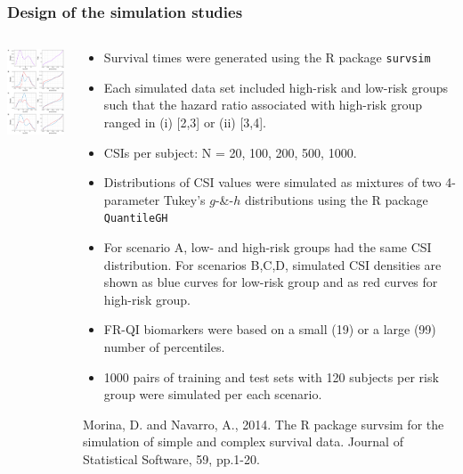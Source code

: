 \documentclass[t,8pt]{beamer}
\begin{document}
\frame
   {\frametitle{Design of the simulation studies}  	 
     \begin{columns}[T]
		      \begin{column}{0.4\textwidth}
			\includegraphics[width=2in] {Figures/Figures_simulations/density.quantile.plot.pdf}
		      \end{column}
		\begin{column}{0.6\textwidth}
	   	\begin{itemize} 
	\item Survival times were generated using the R package \texttt{survsim}  \cite{survsim}
	\item Each simulated data set included high-risk and low-risk groups such that the hazard ratio associated with high-risk group ranged in (i) [2,3] or (ii) [3,4].
		\item CSIs per subject: N = 20, 100, 200, 500, 1000. 
	\item Distributions of CSI values were simulated as mixtures of two 4-parameter Tukey's $g$-\&-$h$ distributions using the R package \texttt{QuantileGH} 
	\item For scenario A, low- and high-risk groups had the same CSI distribution.  For scenarios B,C,D, simulated CSI densities are shown as blue curves for low-risk group
	 and as red curves for high-risk group.
	\item FR-QI biomarkers were based on a small (19) or a large (99) number of percentiles.
	\item 1000 pairs of training and test sets with 120 subjects per risk group were simulated per each scenario.
  \end{itemize}   	
\begin{thebibliography}{ }	
\begin{footnotesize}
Morina, D. and Navarro, A., 2014. The R package survsim for the simulation of simple and complex survival data. Journal of Statistical Software, 59, pp.1-20.
\end{footnotesize}
\end{thebibliography}	
		      \end{column}		
	\end{columns} 
}
\end{document}
